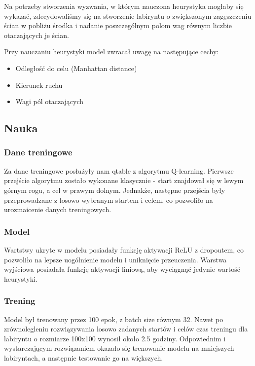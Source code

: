 \documentclass[a4paper,12pt]{article}
\begin{document}
  Na potrzeby stworzenia wyzwania, w którym nauczona heurystyka mogłaby się
  wykazać, zdecydowaliśmy się na stworzenie labiryntu o zwiększonym zagęszczeniu
  ścian w pobliżu środka i nadanie poszczególnym polom wag równym liczbie
  otaczających je ścian.

  Przy nauczaniu heurystyki model zwracał uwagę na następujące cechy:
  \begin{itemize}
    \item Odległość do celu (Manhattan distance) 
    \item Kierunek ruchu
    \item Wagi pól otaczających
  \end{itemize}

\subsection{Nauka}

  \subsubsection{Dane treningowe}
  Za dane treningowe posłużyły nam qtable z algorytmu Q-learning.
  Pierwsze przejście algorytmu zostało wykonane klasycznie - start znajdował się
  w lewym górnym rogu, a cel w prawym dolnym. Jednakże, następne przejścia były
  przeprowadzane z losowo wybranym startem i celem, co pozwoliło na 
  urozmaicenie danych treningowych.


  \subsubsection{Model}
  Wartstwy ukryte w modelu posiadały funkcję aktywacji ReLU z dropoutem, co
  pozwoliło na lepsze uogólnienie modelu i uniknięcie przeuczenia.
  Warstwa wyjściowa posiadała funkcję aktywacji liniową, aby wyciągnąć jedynie
  wartość heurystyki.

  \subsubsection{Trening}
  Model był trenowany przez 100 epok, z batch size równym 32.
  Nawet po zrównolegleniu rozwiązywania losowo zadanych startów i celów
  czas treningu dla labiryntu o rozmiarze 100x100 wynosił około 2.5 godziny.
  Odpowiednim i wystarczającym rozwiązaniem okazało się trenowanie modelu
  na mniejszych labiryntach, a następnie testowanie go na większych.
\end{document}
